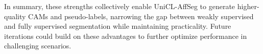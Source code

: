 In summary, these strengths collectively enable UniCL-AffSeg to generate higher-quality CAMs and pseudo-labels, narrowing the gap between weakly supervised and fully supervised segmentation while maintaining practicality. Future iterations could build on these advantages to further optimize performance in challenging scenarios.